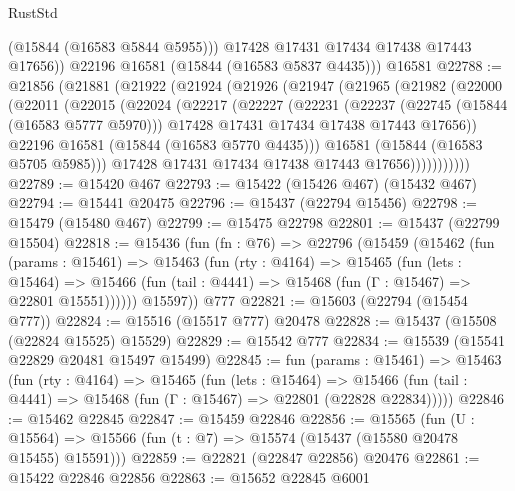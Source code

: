 \begin{lexlean}{RustStd}
\begin{coremodule}
            (@15844 (@16583 @5844 @5955)))
          @17428
          @17431
          @17434
          @17438
          @17443
          @17656))
      @22196
      @16581
      (@15844 (@16583 @5837 @4435)))
    @16581
@22788 := @21856
    (@21881
      (@21922
        (@21924
          (@21926
            (@21947
              (@21965
                (@21982
                  (@22000
                    (@22011
                      (@22015
                        (@22024
                          (@22217
                            (@22227
                              (@22231
                                (@22237
                                  (@22745 (@15844 (@16583 @5777 @5970)))
                                  @17428
                                  @17431
                                  @17434
                                  @17438
                                  @17443
                                  @17656))
                              @22196
                              @16581
                              (@15844 (@16583 @5770 @4435)))
                            @16581
                            (@15844 (@16583 @5705 @5985)))
                          @17428
                          @17431
                          @17434
                          @17438
                          @17443
                          @17656)))))))))))
@22789 := @15420 @467
@22793 := @15422 (@15426 @467) (@15432 @467)
@22794 := @15441 @20475
@22796 := @15437 (@22794 @15456)
@22798 := @15479 (@15480 @467)
@22799 := @15475 @22798
@22801 := @15437 (@22799 @15504)
@22818 := @15436
    (fun (fn : @76) =>
    @22796
      (@15459
        (@15462
          (fun (params : @15461) =>
          @15463
            (fun (rty : @4164) =>
            @15465
              (fun (lets : @15464) =>
              @15466 (fun (tail : @4441) => @15468 (fun (Γ : @15467) => @22801 @15551))))))
        @15597))
    @777
@22821 := @15603 (@22794 (@15454 @777))
@22824 := @15516 (@15517 @777) @20478
@22828 := @15437 (@15508 (@22824 @15525) @15529)
@22829 := @15542 @777
@22834 := @15539 (@15541 @22829 @20481 @15497 @15499)
@22845 := fun (params : @15461) =>
  @15463
    (fun (rty : @4164) =>
    @15465
      (fun (lets : @15464) =>
      @15466 (fun (tail : @4441) => @15468 (fun (Γ : @15467) => @22801 (@22828 @22834)))))
@22846 := @15462 @22845
@22847 := @15459 @22846
@22856 := @15565
    (fun (U : @15564) => @15566 (fun (t : @7) => @15574 (@15437 (@15580 @20478 @15455) @15591)))
@22859 := @22821 (@22847 @22856) @20476
@22861 := @15422 @22846 @22856
@22863 := @15652 @22845 @6001

\end{coremodule}
\end{lexlean}
